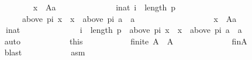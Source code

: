 \begin{isabellebody}
\ \ \ \ \ \ \ \ \isamarkupfalse%
\isanewline
\ \ \ \ \ \ \ \ \ \ {\isachardoublequoteopen}{\isasymnot}{\isacharparenleft}{\kern0pt}{\isasymforall}x\ {\isasymin}\ A{\isacharminus}{\kern0pt}{\isacharbraceleft}{\kern0pt}a{\isacharbraceright}{\kern0pt}{\isachardot}{\kern0pt}\isanewline
\ \ \ \ \ \ \ \ \ \ \ \ \ \ {\isasymforall}i{\isacharcolon}{\kern0pt}{\isacharcolon}{\kern0pt}nat{\isachardot}{\kern0pt}\ i\ {\isacharless}{\kern0pt}\ length\ p\ {\isasymlongrightarrow}\isanewline
\ \ \ \ \ \ \ \ \ \ \ \ \ \ \ \ {\isacharparenleft}{\kern0pt}above\ {\isacharparenleft}{\kern0pt}p{\isacharbang}{\kern0pt}i{\isacharparenright}{\kern0pt}\ x\ {\isacharequal}{\kern0pt}\ {\isacharbraceleft}{\kern0pt}x{\isacharbraceright}{\kern0pt}\ {\isasymlongrightarrow}\ above\ {\isacharparenleft}{\kern0pt}p{\isacharbang}{\kern0pt}i{\isacharparenright}{\kern0pt}\ a\ {\isasymnoteq}\ {\isacharbraceleft}{\kern0pt}a{\isacharbraceright}{\kern0pt}{\isacharparenright}{\kern0pt}{\isacharparenright}{\kern0pt}{\isachardoublequoteclose}\isanewline
\ \ \ \ \ \ \ \ \isamarkupfalse%
\isanewline
\ \ \ \ \ \ \ \ \ \ {\isachardoublequoteopen}{\isasymexists}x\ {\isasymin}\ A{\isacharminus}{\kern0pt}{\isacharbraceleft}{\kern0pt}a{\isacharbraceright}{\kern0pt}{\isachardot}{\kern0pt}\isanewline
\ \ \ \ \ \ \ \ \ \ \ \ {\isasymexists}i{\isacharcolon}{\kern0pt}{\isacharcolon}{\kern0pt}nat{\isachardot}{\kern0pt}\isanewline
\ \ \ \ \ \ \ \ \ \ \ \ \ \ i\ {\isacharless}{\kern0pt}\ length\ p\ {\isasymand}\ above\ {\isacharparenleft}{\kern0pt}p{\isacharbang}{\kern0pt}i{\isacharparenright}{\kern0pt}\ x\ {\isacharequal}{\kern0pt}\ {\isacharbraceleft}{\kern0pt}x{\isacharbraceright}{\kern0pt}\ {\isasymand}\ above\ {\isacharparenleft}{\kern0pt}p{\isacharbang}{\kern0pt}i{\isacharparenright}{\kern0pt}\ a\ {\isacharequal}{\kern0pt}\ {\isacharbraceleft}{\kern0pt}a{\isacharbraceright}{\kern0pt}{\isachardoublequoteclose}\isanewline
\ \ \ \ \ \ \ \ \ \ \isamarkupfalse%
\ auto\isanewline
\ \ \ \ \ \ \ \ \isamarkupfalse%
\ \isamarkupfalse%
\ this\ \isamarkupfalse%
\isanewline
\ \ \ \ \ \ \ \ \ \ {\isachardoublequoteopen}finite\ A\ {\isasymand}\ A\ {\isasymnoteq}\ {\isacharbraceleft}{\kern0pt}{\isacharbraceright}{\kern0pt}{\isachardoublequoteclose}\isanewline
\ \ \ \ \ \ \ \ \ \ \isamarkupfalse%
\ fin{\isacharunderscore}{\kern0pt}A\isanewline
\ \ \ \ \ \ \ \ \ \ \isamarkupfalse%
\ blast\isanewline
\ \ \ \ \ \ \ \ \isamarkupfalse%
\ \isamarkupfalse%
\ asm{}\ \isamarkupfalse%

\end{isabellebody}
